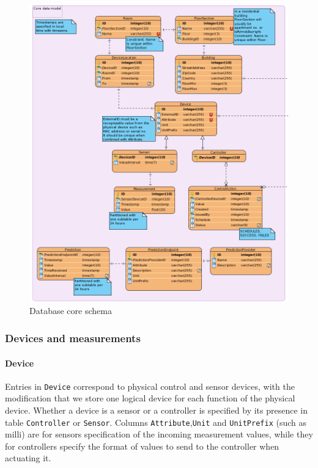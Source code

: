 \documentclass{report}
\begin{document}
\begin{figure}[H]
    \centering
    \includegraphics[width=\textwidth]{figures/db_core_schema}
    \caption{Database core schema}
    \label{figureDbCoreModel}
\end{figure}

\subsubsection{Devices and measurements}

\paragraph{Device} 
Entries in \texttt{Device} correspond to physical control and sensor devices, with the modification that we store one logical device for each function of the physical device. Whether a device is a sensor or a controller is specified by its presence in table \texttt{Controller} or \texttt{Sensor}. Columns \texttt{Attribute},\texttt{Unit} and \texttt{UnitPrefix} (such as milli) are for sensors specification of the incoming measurement values, while they for controllers specify the format of values to send to the controller when actuating it.
\end{document}
